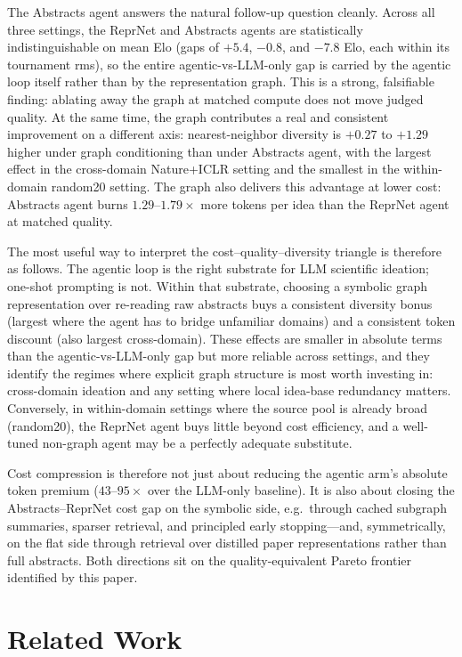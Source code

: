 \documentclass[10pt,twocolumn]{article}
\begin{document}
The Abstracts agent answers the natural follow-up question
cleanly.  Across all three settings, the ReprNet and Abstracts agents are
statistically indistinguishable on mean Elo (gaps of $+5.4$, $-0.8$,
and $-7.8$ Elo, each within its tournament rms), so the entire
agentic-vs-LLM-only gap is carried by the agentic loop itself rather
than by the representation graph.  This is a strong, falsifiable
finding: ablating away the graph at matched compute does not move
judged quality.  At the same time, the graph contributes a real and
consistent improvement on a different axis: nearest-neighbor diversity
is $+0.27$ to $+1.29$ higher under graph conditioning than under
Abstracts agent, with the largest effect in the cross-domain Nature+ICLR
setting and the smallest in the within-domain random20 setting.  The
graph also delivers this advantage at lower cost: Abstracts agent burns
$1.29$--$1.79\times$ more tokens per idea than the ReprNet agent at
matched quality.

The most useful way to interpret the cost--quality--diversity triangle
is therefore as follows.  The agentic loop is the right substrate for
LLM scientific ideation; one-shot prompting is not.  Within that
substrate, choosing a symbolic graph representation over re-reading
raw abstracts buys a consistent diversity bonus (largest where the
agent has to bridge unfamiliar domains) and a consistent token
discount (also largest cross-domain).  These effects are smaller in
absolute terms than the agentic-vs-LLM-only gap but more reliable across
settings, and they identify the regimes where explicit graph structure
is most worth investing in: cross-domain ideation and any setting
where local idea-base redundancy matters.  Conversely, in
within-domain settings where the source pool is already broad
(random20), the ReprNet agent buys little beyond cost efficiency, and a
well-tuned non-graph agent may be a perfectly adequate substitute.

Cost compression is therefore not just about reducing the agentic
arm's absolute token premium ($43$--$95\times$ over the LLM-only
baseline).  It is also about closing the Abstracts--ReprNet cost gap on
the symbolic side, e.g.\ through cached subgraph summaries, sparser
retrieval, and principled early stopping---and, symmetrically, on the
flat side through retrieval over distilled paper representations
rather than full abstracts.  Both directions sit on the
quality-equivalent Pareto frontier identified by this paper.


\section{Related Work}
\end{document}
